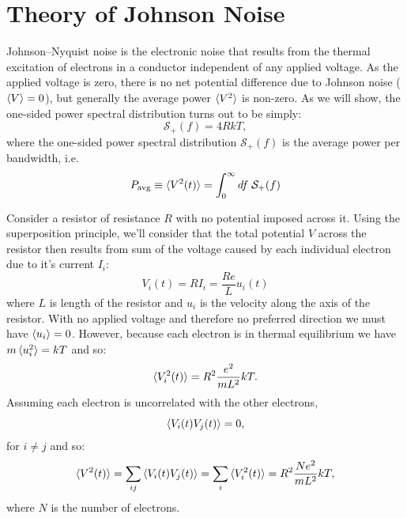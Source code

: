 \documentclass[12pt]{article}
\begin{document}
\section{Theory of Johnson Noise}

Johnson--Nyquist noise is the electronic noise that results from the thermal excitation of electrons in a conductor independent of any applied voltage.  As the applied voltage is zero, there is no net potential difference due to Johnson noise ($\braket{V}=0$), but generally the average power $\braket{V^2}$ is non-zero.  As we will show, the one-sided power spectral distribution turns out to be simply:
\begin{equation}
\mathcal{S}_{+}(f) = 4 R k T,
\end{equation}
where the one-sided power spectral distribution $\mathcal{S}_+(f)$ is the average power per bandwidth, i.e.
\begin{displaymath}
P_{\rm avg} \equiv \braket{V^2(t)} = \int_{0}^{\infty} df \; \mathcal{S}_{+}(f) 
\end{displaymath}

Consider a resistor of resistance $R$ with no potential imposed across it.  Using the superposition principle, we'll consider that the total potential $V$ across the resistor then results from sum of the voltage caused by each individual electron due to it's current $I_i$:
\begin{displaymath}
V_i(t) = R I_i = \frac{Re}{L} u_i(t)
\end{displaymath}
where $L$ is length of the resistor and $u_i$ is the velocity along the axis of the resistor.  With no applied voltage and therefore no preferred direction we must have $\braket{u_i}=0$.  However, because each electron is in thermal equilibrium we have $m\braket{u^2_i}=kT$ and so:
\begin{displaymath}
\braket{V^2_i(t)} = R^2 \frac{e^2}{m L^2} kT.
\end{displaymath}
Assuming each electron is uncorrelated with the other electrons,
\begin{displaymath}
\braket{V_i(t) V_j(t)} = 0,
\end{displaymath}
for $i \neq j$ and so:
\begin{displaymath}
\braket{V^2(t)} =  \sum_{ij}  \braket{ V_i(t) V_j(t) } = \sum_{i}  \braket{ V^2_i(t) } = R^2 \frac{N e^2}{m L^2} kT,
\end{displaymath}
where $N$ is the number of electrons.
\end{document}
